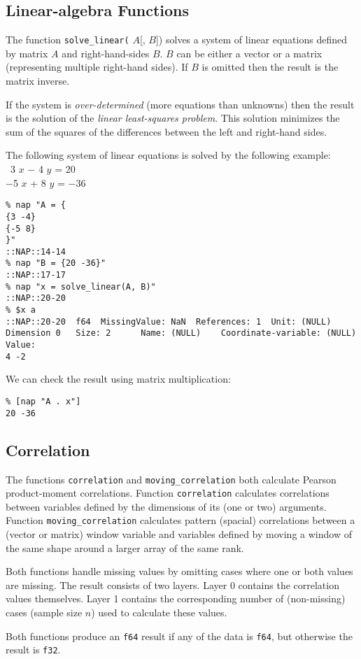   \subsection{
    \label{Linear-algebra}Linear-algebra Functions
  }

  \par The function 
  \texttt{solve\_linear(} 
  $A$[, 
  $B$]) solves a system of linear equations defined by matrix 
  $A$ and right-hand-sides 
  $B$. 
  $B$ can be either a vector or a matrix (representing
  multiple right-hand sides). If 
  $B$ is omitted then the result is the matrix inverse.
  \par If the system is 
  \textit{over-determined} (more equations than unknowns) then the
  result is the solution of the 
  \textit{linear least-squares problem}. This solution minimizes the
  sum of the squares of the differences between the left and right-hand
  sides.
  \par The following system of linear equations is solved by the
  following example:
  \\\  3 
  $x$ $-$ 4 
  $y$ = 20
  \\$-$5 
  $x$ + 8 
  $y$ = $-$36
  \begin{verbatim}
% nap "A = {
{3 -4}
{-5 8}
}"
::NAP::14-14
% nap "B = {20 -36}"
::NAP::17-17
% nap "x = solve_linear(A, B)"
::NAP::20-20
% $x a
::NAP::20-20  f64  MissingValue: NaN  References: 1  Unit: (NULL)
Dimension 0   Size: 2      Name: (NULL)    Coordinate-variable: (NULL)
Value:
4 -2
\end{verbatim}

  \par We can check the result using matrix multiplication:
  \begin{verbatim}
% [nap "A . x"]
20 -36
\end{verbatim}

  \subsection{
    \label{Correlation}Correlation
  }

  \par The functions 
  \texttt{correlation} and 
  \texttt{moving\_correlation} both calculate Pearson product-moment
  correlations. Function 
  \texttt{correlation} calculates correlations between variables
  defined by the dimensions of its (one or two) arguments. Function 
  \texttt{moving\_correlation} calculates pattern (spacial)
  correlations between a (vector or matrix) window variable and
  variables defined by moving a window of the same shape around a
  larger array of the same rank.
  \par Both functions handle missing values by omitting cases where one
  or both values are missing. The result consists of two layers. Layer
  0 contains the correlation values themselves. Layer 1 contains the
  corresponding number of (non-missing) cases (sample size 
  $n$) used to calculate these values.
  \par Both functions produce an 
  \texttt{f64} result if any of the data is 
  \texttt{f64}, but otherwise the result is 
  \texttt{f32}.
